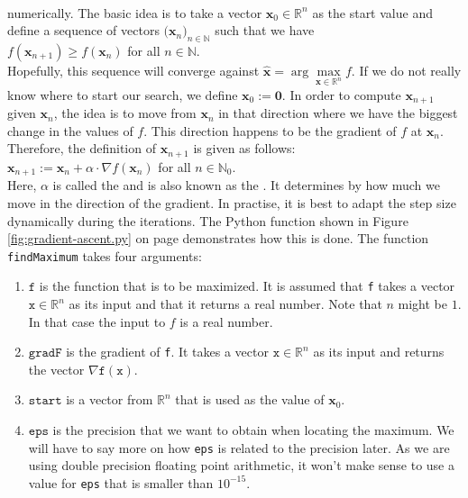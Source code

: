\\[0.2cm]
numerically.  The basic idea is to take a vector $\mathbf{x}_0 \in \mathbb{R}^n$ as the start value and define a sequence of
vectors $\bigl(\mathbf{x}_n\bigr)_{n\in\mathbb{N}}$ such that we have
\\[0.2cm]
\hspace*{1.3cm}
$f(\mathbf{x}_{n+1}) \geq f(\mathbf{x}_{n})$ \quad for all $n\in\mathbb{N}$.
\\[0.2cm]
Hopefully, this sequence will converge against $\widehat{\mathbf{x}} = \arg\max\limits_{\mathbf{x}\in \mathbb{R}^n}f$.
If we do not really know where to start our search, we define $\mathbf{x}_0 := \mathbf{0}$.  In order to
compute $\mathbf{x}_{n+1}$ given $\mathbf{x}_{n}$, the idea is to move from $\mathbf{x}_n$ in that direction
where we have the biggest change in the values of $f$.   This direction happens to be the gradient of $f$ at $\mathbf{x}_n$.
Therefore, the definition of $\mathbf{x}_{n+1}$ is given as follows:
\\[0.2cm]
\hspace*{1.3cm}
$\mathbf{x}_{n+1} := \mathbf{x}_n + \alpha \cdot \nabla f(\mathbf{x}_n)$ \quad for all $n \in \mathbb{N}_0$.
\\[0.2cm]
Here, $\alpha$ is called the  and is also known as the .  It determines by how
much we move in the direction of the gradient.  In practise, it is best to adapt the step size dynamically
during the iterations.  The Python function shown in Figure \ref{fig:gradient-ascent.py} on page
\pageref{fig:gradient-ascent.py} demonstrates how this is done. 
The function \texttt{findMaximum} takes four arguments:
\begin{enumerate}
\item $\texttt{f}$ is the function that is to be maximized.  It is assumed that \texttt{f} takes a vector
      $\texttt{x}\in \mathbb{R}^n$ as its input and that it returns a real number.  Note that $n$ might be
      $1$.  In that case the input to $f$ is a real number.
\item $\texttt{gradF}$ is the gradient of \texttt{f}.  It takes a vector
      $\texttt{x}\in \mathbb{R}^n$ as its input and returns the vector $\nabla \mathtt{f}(\mathtt{x})$.
\item $\texttt{start}$ is a vector from $\mathbb{R}^n$ that is used as the value of $\mathbf{x}_0$.  
\item $\texttt{eps}$ is the precision that we want to obtain when locating the maximum.  We will have to say more on how \texttt{eps}
      is related to the precision later.  As we are using double precision floating point arithmetic, 
      it won't make sense to use a value for \texttt{eps} that is smaller than $10^{-15}$.
\end{enumerate}
